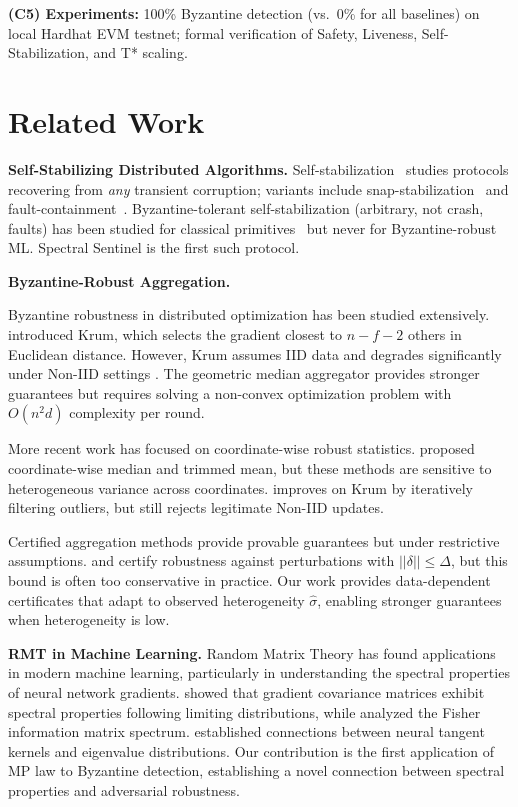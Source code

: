 \documentclass[runningheads]{llncs}
\begin{document}
\textbf{(C5) Experiments:} 100\% Byzantine detection (vs.\ 0\% for all baselines) on local Hardhat EVM testnet; formal verification of Safety, Liveness, Self-Stabilization, and T* scaling.

\section{Related Work}

\noindent\textbf{Self-Stabilizing Distributed Algorithms.} Self-stabilization~\cite{dijkstra_self_stab,dolev_self_stab,herman_survey} studies protocols recovering from \emph{any} transient corruption; variants include snap-stabilization~\cite{snap_stab} and fault-containment~\cite{fault_containment}. Byzantine-tolerant self-stabilization (arbitrary, not crash, faults) has been studied for classical primitives~\cite{bft_selfstab} but never for Byzantine-robust ML. Spectral Sentinel is the first such protocol.

\noindent\textbf{Byzantine-Robust Aggregation.}

Byzantine robustness in distributed optimization has been studied extensively. \cite{krum} introduced Krum, which selects the gradient closest to $n-f-2$ others in Euclidean distance. However, Krum assumes IID data and degrades significantly under Non-IID settings \cite{non_iid_challenges}. The geometric median aggregator \cite{geometric_median} provides stronger guarantees but requires solving a non-convex optimization problem with $O(n^2 d)$ complexity per round.

More recent work has focused on coordinate-wise robust statistics. \cite{byzantine_ml} proposed coordinate-wise median and trimmed mean, but these methods are sensitive to heterogeneous variance across coordinates. \cite{bulyan} improves on Krum by iteratively filtering outliers, but still rejects legitimate Non-IID updates.

Certified aggregation methods provide provable guarantees but under restrictive assumptions. \cite{crfl} and \cite{byzshield} certify robustness against perturbations with $||\delta|| \leq \Delta$, but this bound is often too conservative in practice. Our work provides data-dependent certificates that adapt to observed heterogeneity $\hat{\sigma}$, enabling stronger guarantees when heterogeneity is low.

\noindent\textbf{RMT in Machine Learning.} Random Matrix Theory has found applications in modern machine learning, particularly in understanding the spectral properties of neural network gradients. \cite{rmt_gradients} showed that gradient covariance matrices exhibit spectral properties following limiting distributions, while \cite{rmt_neural} analyzed the Fisher information matrix spectrum. \cite{spectral_analysis} established connections between neural tangent kernels and eigenvalue distributions. Our contribution is the first application of MP law \cite{mp_law} to Byzantine detection, establishing a novel connection between spectral properties and adversarial robustness.
\end{document}
